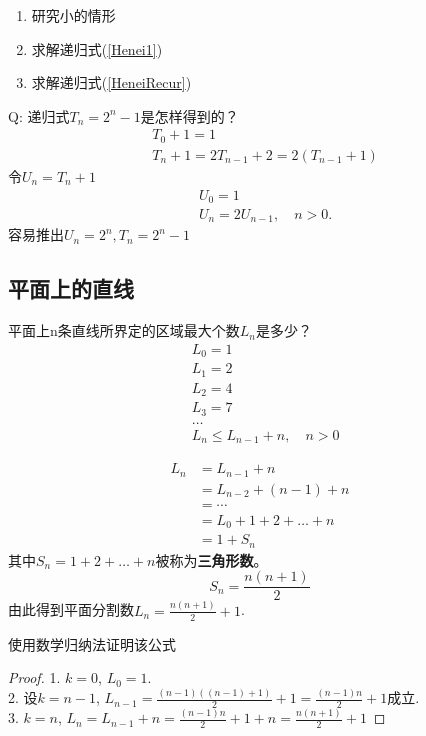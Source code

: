 \begin{remark}
	\begin{enumerate}
		\item  研究小的情形
		\item  求解递归式(\ref{Henei1})
		\item  求解递归式(\ref{HeneiRecur})
	\end{enumerate}
\end{remark}

Q: 递归式$ T_n= 2^n -1 $是怎样得到的？
\begin{align*}
	&T_0 + 1 = 1\\
	&T_n+1 = 2T_{n-1}+2 = 2(T_{n-1}+1)
\end{align*}
令$ U_n = T_n+1 $
\begin{align*}
	&U_0 = 1\\
	&U_n = 2U_{n-1}, \quad n>0.
\end{align*}
容易推出$ U_n  = 2^n, T_n = 2^n-1 $

\subsection{平面上的直线}
平面上n条直线所界定的区域最大个数$ L_n $是多少？
\begin{align*}
	&L_0 = 1\\
	&L_1 = 2\\
	&L_2 = 4\\
	&L_3 = 7\\
	&\ldots\\
	&L_n \leqslant L_{n-1}+n, \quad n>0	
\end{align*}

\begin{align*}
	L_n &= L_{n-1} + n\\
	& = L_{n-2}+(n-1)+n\\
	&=\cdots\\
	&=L_0+1+2+\dots+n\\
	&=1+S_n
\end{align*}
其中$ S_n = 1+2+\dots+n $被称为\textbf{三角形数}。
\begin{equation}\label{sanjiaoxingshu}
	S_n = \frac{n(n+1)}{2}
\end{equation}
由此得到平面分割数$ L_n = \frac{n(n+1)}{2}+1 $.

使用数学归纳法证明该公式
\begin{proof}
	1. $ k=0 $, $ L_0 = 1 $.\\
	2. 设$ k=n-1 $, $ L_{n-1} = \frac{(n-1)((n-1)+1)}{2}+1=\frac{(n-1)n}{2}+1 $成立.\\
	3. $ k=n $, $ L_n = L_{n-1}+n = \frac{(n-1)n}{2}+1+n = \frac{n(n+1)}{2}+1 $
\end{proof}

